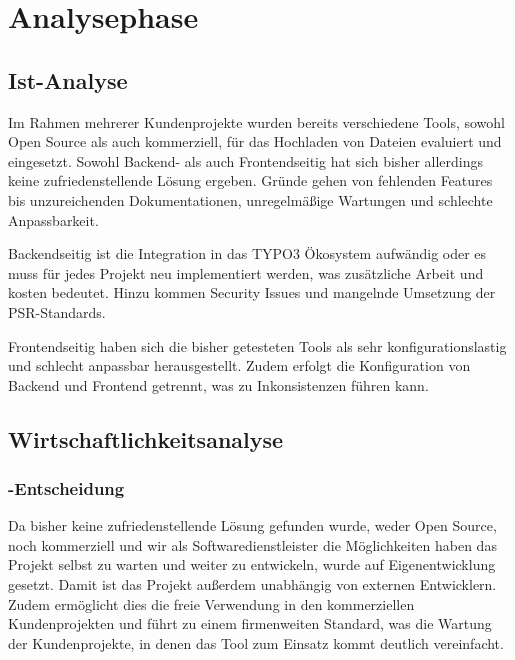 \section{Analysephase} 
\label{sec:Analysephase}


\subsection{Ist-Analyse} 
\label{sec:IstAnalyse}

Im Rahmen mehrerer Kundenprojekte wurden bereits verschiedene Tools, sowohl Open Source als auch kommerziell, für das Hochladen von Dateien evaluiert und eingesetzt. Sowohl Backend- als auch Frontendseitig hat sich bisher allerdings keine zufriedenstellende Lösung ergeben. Gründe gehen von fehlenden Features bis unzureichenden Dokumentationen, unregelmäßige Wartungen und schlechte Anpassbarkeit. 

Backendseitig ist die Integration in das TYPO3 Ökosystem aufwändig oder es muss für jedes Projekt neu implementiert werden, was zusätzliche Arbeit und kosten bedeutet. Hinzu kommen Security Issues und mangelnde Umsetzung der PSR-Standards.  

Frontendseitig haben sich die bisher getesteten Tools als sehr konfigurationslastig und schlecht anpassbar herausgestellt. Zudem erfolgt die Konfiguration von Backend und Frontend getrennt, was zu Inkonsistenzen führen kann. 


\subsection{Wirtschaftlichkeitsanalyse}
\label{sec:Wirtschaftlichkeitsanalyse}

\subsubsection{-Entscheidung}
\label{sec:MakeOrBuyEntscheidung}
Da bisher keine zufriedenstellende Lösung gefunden wurde, weder Open Source, noch kommerziell und wir als Softwaredienstleister die Möglichkeiten haben das Projekt selbst zu warten und weiter zu entwickeln, wurde auf Eigenentwicklung gesetzt. Damit ist das Projekt außerdem unabhängig von externen Entwicklern. Zudem ermöglicht dies die freie Verwendung in den kommerziellen Kundenprojekten und führt zu einem firmenweiten Standard, was die Wartung der Kundenprojekte, in denen das Tool zum Einsatz kommt deutlich vereinfacht.


